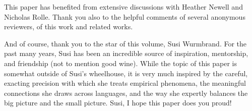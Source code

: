 \documentclass[output=paper]{langscibook}
\begin{document}
This paper has benefited from extensive discussions with Heather Newell and Nicholas Rolle. Thank you also to the helpful comments of several anonymous reviewers, of this work and related works. 

And of course, thank you to the star of this volume, Susi Wurmbrand. For the past many years, Susi has been an incredible source of inspiration, mentorship, and friendship (not to mention good wine). While the topic of this paper is somewhat outside of Susi's wheelhouse, it is very much inspired by the careful, exacting precision with which she treats empirical phenomena, the meaningful connections she draws across languages, and the way she expertly balances the big picture and the small picture. Susi, I hope this paper does you proud!

\printbibliography[heading=subbibliography,notkeyword=this]
\end{document}
